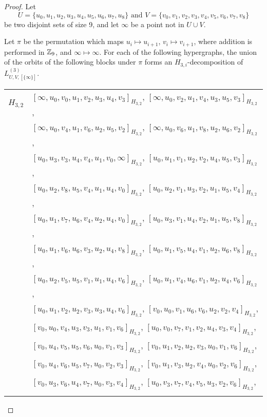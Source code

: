 \begin{subappendices}
\begin{proof}
Let
\[
    U = \{u_0, u_1, u_2, u_3, u_4, u_5, u_6, u_7, u_8\} \text{ and }
    V = \{v_0, v_1, v_2, v_3, v_4, v_5, v_6, v_7, v_8\}
\]
be two disjoint sets of size 9, and let $\infty$ be a point not in $U \cup V$.

Let $\pi$ be the permutation which maps $u_i \mapsto u_{i+1}$, $v_i \mapsto v_{i+1}$, where addition is performed in $\mathbb{Z}_9$, and $\infty \mapsto \infty$.
For each of the following hypergraphs, the union of the orbits of the following blocks under $\pi$ forms an $H_{3,i}$-decomposition of $L_{U,V,[\{\infty\}]}^{(3)}$.

{ \small
\begin{longtable}{|c|l|}
\hline
$H_{3,2}$ &
  $[\infty, u_0, v_0, u_1, v_2, u_3, u_4, v_3]_{H_{3,2}}$,
  $[\infty, u_0, v_2, u_1, v_4, u_3, u_5, v_3]_{H_{3,2}}$, \\* &
  $[\infty, u_0, v_4, u_1, v_6, u_2, u_5, v_2]_{H_{3,2}}$,
  $[\infty, u_0, v_6, u_1, v_8, u_2, u_6, v_2]_{H_{3,2}}$, \\* &
  $[u_0, u_3, v_3, u_4, v_4, u_1, v_0, \infty]_{H_{3,2}}$,
  $[u_0, u_1, v_1, u_2, v_2, u_4, u_5, v_3]_{H_{3,2}}$, \\* &
  $[u_0, u_2, v_8, u_5, v_4, u_1, u_4, v_0]_{H_{3,2}}$,
  $[u_0, u_2, v_1, u_3, v_2, u_1, u_5, v_4]_{H_{3,2}}$, \\* &
  $[u_0, u_1, v_7, u_6, v_4, u_2, u_4, v_0]_{H_{3,2}}$,
  $[u_0, u_3, v_1, u_4, v_2, u_1, u_5, v_8]_{H_{3,2}}$, \\* &
  $[u_0, u_1, v_6, u_6, v_3, u_2, u_4, v_8]_{H_{3,2}}$,
  $[u_0, u_1, v_5, u_4, v_1, u_2, u_6, v_8]_{H_{3,2}}$, \\* &
  $[u_0, u_2, v_5, u_5, v_1, u_1, u_4, v_6]_{H_{3,2}}$,
  $[u_0, u_1, v_4, u_6, v_1, u_2, u_4, v_6]_{H_{3,2}}$, \\* &
  $[u_0, u_1, v_2, u_2, v_3, u_3, u_4, v_6]_{H_{3,2}}$,
  $[v_0, u_0, v_1, u_6, v_6, u_2, v_2, v_4]_{H_{3,2}}$, \\* &
  $[v_0, u_0, v_4, u_3, v_3, u_1, v_1, v_6]_{H_{3,2}}$,
  $[u_0, v_0, v_7, v_1, v_2, u_4, v_3, v_4]_{H_{3,2}}$, \\* &
  $[v_0, u_4, v_5, u_5, v_6, u_0, v_1, v_3]_{H_{3,2}}$,
  $[v_0, u_1, v_2, u_2, v_3, u_0, v_1, v_6]_{H_{3,2}}$, \\* &
  $[v_0, u_4, v_6, u_5, v_7, u_0, v_2, v_3]_{H_{3,2}}$,
  $[v_0, u_1, v_3, u_2, v_4, u_0, v_2, v_6]_{H_{3,2}}$, \\* &
  $[v_0, u_3, v_6, u_4, v_7, u_0, v_3, v_4]_{H_{3,2}}$,
  $[u_0, v_3, v_7, v_4, v_5, u_3, v_2, v_6]_{H_{3,2}}$, \\* &

\end{longtable}}
\end{proof}
\end{subappendices}
